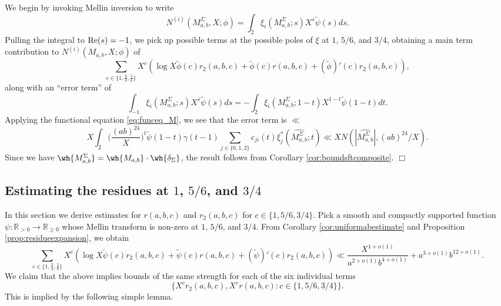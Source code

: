 \documentclass{article}
\def\Re{{\rm Re}}
\def\R{{\mathbb R}}
\def\wt{\widetilde}
\newenvironment{proof}{\noindent {\bf Proof:}}{$\Box$ \vspace{2 ex}}
\begin{document}
\begin{proof}
We begin by invoking Mellin inversion to write
\begin{equation*}
N^{(i)}(M^\Sigma_{a,b},X;\phi)=\int_{2}\xi_i(M^{\Sigma}_{a,b};s) X^s\wt{\psi}(s)ds.
\end{equation*}
Pulling the integral to $\Re(s)=-1$, we pick up possible terms at the possible poles of $\xi$ at $1$, $5/6$, and $3/4$, obtaining a main term contribution to $N^{(i)}(M_{a,b},X;\phi)$ of
\begin{equation*}
\sum_{c\in \{1,\frac34,\frac56\}}X^c\left(\log X\tilde{\phi}(c)r_2(a,b,c)+\tilde{\phi}(c)r(a,b,c)+(\tilde{\phi})'(c)r_2(a,b,c) \right),
\end{equation*}
along with an ``error term'' of
\begin{equation*}
\int_{-1}\xi_i(M^{\Sigma}_{a,b};s) X^s\wt{\psi}(s)ds=
-\int_{2}\xi_i(M^{\Sigma}_{a,b};1-t) X^{1-t}\wt{\psi}(1-t)dt.
\end{equation*}
Applying the functional equation \eqref{eq:funceq_M}, we see that the error term is $\ll$
\begin{equation*}
X\int_{2}\Big(\frac{(ab)^{24}}{X}\Big)^t\wt{\psi}(1-t)\gamma(t-1)\sum_{j\in\{0,1,2\}}c_{ji}(t)\xi_j^*(\widehat{M^{\Sigma}_{a,b}};t)\ll X N(|\widehat{M^\Sigma_{a,b}}|,(ab)^{24}/X).
\end{equation*}
Since we have $\wh{M^{\Sigma}_{a,b}} = \wh{M_{a,b}}\cdot\wh{\delta_{\Sigma}}$, the result follows from Corollary \ref{cor:boundsftcomposite}.
\end{proof}


\subsection{Estimating the residues at $1$, $5/6$, and $3/4$}
In this section we derive estimates for $r(a,b,c)$ and $r_2(a,b,c)$ for $c\in\{1,5/6,3/4\}$. Pick a smooth and compactly supported function $\psi:\R_{>0}\to\R_{\geq 0}$ whose Mellin transform is non-zero at $1$, $5/6$, and $3/4$. From Corollary \ref{cor:uniformabestimate} and Proposition \ref{prop:residueexpansion}, we obtain
$$\sum_{c\in \{1,\frac34,\frac56\}}X^c\left(\log X\tilde{\psi}(c)r_2(a,b,c)+\tilde{\psi}(c)r(a,b,c)+(\tilde{\psi})'(c)r_2(a,b,c) \right) \ll \frac{X^{1+o(1)}}{a^{2+o(1)}b^{4+o(1)}}+a^{3+o(1)}b^{12+o(1)}.$$
We claim that the above implies bounds of the same strength for each of the six individual terms 
$$\{X^cr_2(a,b,c),X^cr(a,b,c):c\in\{1,5/6,3/4\}\}.$$ 
This is implied by the following simple lemma.
\end{document}
